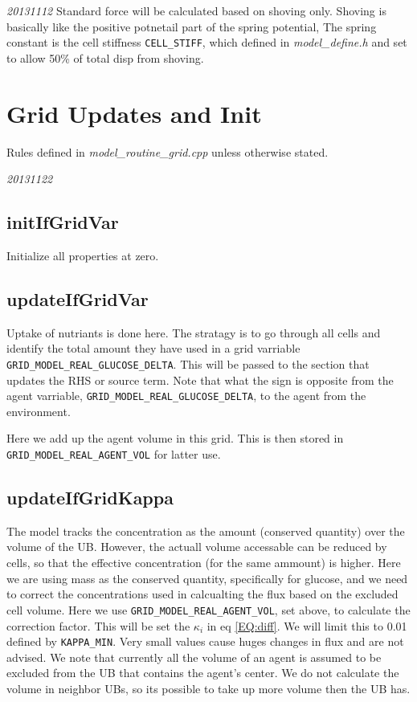 \documentclass{article}
\begin{document}
\emph{20131112} Standard force will be calculated based on shoving only.
Shoving is basically like the positive potnetail part of the spring potential,
The spring constant is the cell stiffness \texttt{CELL\_STIFF}, 
which defined in \textit{model\_define.h} and set to allow 50\% of total disp from shoving.


\section{Grid Updates and Init}
Rules defined in \textit{model\_routine\_grid.cpp} unless otherwise stated.

\emph{20131122} 
\subsection{initIfGridVar}
Initialize all properties at zero.

\subsection{updateIfGridVar}
Uptake of nutriants is done here. 
The stratagy is to go through all cells and identify the total amount they have used in a grid varriable \texttt{GRID\_MODEL\_REAL\_GLUCOSE\_DELTA}.
This will be passed to the section that updates the RHS or source term.
Note that what the sign is opposite from the agent varriable, \texttt{GRID\_MODEL\_REAL\_GLUCOSE\_DELTA}, 
to the agent from the environment.

Here we add up the agent volume in this grid.
This is then stored in \texttt{GRID\_MODEL\_REAL\_AGENT\_VOL} for latter use.

\subsection{updateIfGridKappa}


The model tracks the concentration as the amount (conserved quantity) over the volume of the UB.
However, the actuall volume accessable can be reduced by cells, 
so that the effective concentration (for the same ammount) is higher.
Here we are using mass as the conserved quantity, specifically for glucose,
and we need to correct the concentrations used in calcualting the flux based on the excluded cell volume.
Here we use \texttt{GRID\_MODEL\_REAL\_AGENT\_VOL}, set above, 
to calculate the correction factor.
This will be set the $\kappa_i$ in eq \ref{EQ:diff}.
We will limit this to 0.01 defined by \texttt{KAPPA\_MIN}.
Very small values cause huges changes in flux and are not advised.
We note that currently all the volume of an agent is assumed to be excluded from the UB that contains the agent's center.
We do not calculate the volume in neighbor UBs, so its possible to take up more volume then the UB has.
\end{document}
